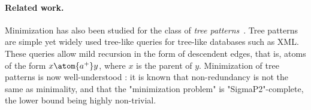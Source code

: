 \paragraph{Related work.}
Minimization has also been studied for the class of \emph{tree patterns}~\cite{FlescaFurfaroMasciari2008Minimization,KimelfeldSagiv2008Revisiting,CzerwinskiMartensNiewerthParys2018Minimization}. Tree patterns are simple yet widely used tree-like queries for tree-like databases such as XML. These queries allow mild recursion in the form of descendent edges, that is, atoms of the form $x \atom{a^+} y$, where $x$ is the parent of $y$. 
Minimization of tree patterns is now well-understood \cite{CzerwinskiMartensNiewerthParys2018Minimization}: it is known that non-redundancy is not the same as minimality, and that the "minimization problem" is "SigmaP2"-complete, the lower bound being highly non-trivial.